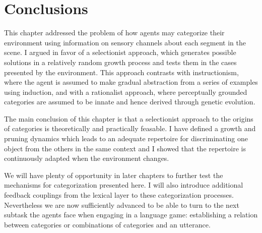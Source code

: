 \section{Conclusions}

This chapter addressed the problem of how agents may 
categorize their environment using information 
on sensory channels about each segment in the scene. 
I argued in favor of a selectionist approach, which 
generates possible solutions in a relatively 
random growth process and tests them in the 
cases presented by the environment. 
This approach contrasts with instructionism, where
the agent is assumed to make gradual abstraction 
from a series of examples using induction, and with 
a rationalist approach, where perceptually grounded categories are
assumed to be innate and hence derived through 
genetic evolution. 

The main conclusion of this chapter is that a selectionist
approach to the origins of categories
is theoretically and practically feasable. I have 
defined a growth and pruning dynamics which leads to 
an adequate repertoire for 
discriminating one object from the others in the 
same context and I showed that the repertoire is
continuously adapted when the environment changes. 

We will have plenty of opportunity in later chapters
to further test the mechanisms for categorization 
presented here. I will also introduce 
additional feedback couplings from the lexical 
layer to these categorization processes. Nevertheless
we are now sufficiently advanced to be able to
turn to the next subtask the agents face when 
engaging in a language game: establishing a relation
between categories or combinations of categories and 
an utterance. 


